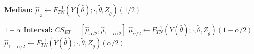 \documentclass[11pt, oneside]{article}
\begin{document}
\begin{algorithm}
\begin{algorithmic}
\vspace{0.2cm}
\STATE \textbf{Median:}
\STATE \hspace{0.3cm} $\hat{\mu}_{\frac{1}{2}} \leftarrow F_{TN}^{-1} \left(Y(\hat{\theta}) ; \cdot, \tilde{\theta}, Z_{\tilde{\theta}}\right)\left(1/2\right)$

\vspace{0.2cm}
\STATE \textbf{$1-\alpha$ Interval:} $CS_{E T}=\left[\hat{\mu}_{\alpha / 2}, \hat{\mu}_{1-\alpha / 2}\right]$
\STATE \hspace{0.3cm} $\hat{\mu}_{\alpha/2} \leftarrow F_{TN}^{-1} \left(Y(\hat{\theta}) ; \cdot, \tilde{\theta}, Z_{\tilde{\theta}}\right)\left(1-\alpha/2\right)$
\STATE \hspace{0.3cm} $\hat{\mu}_{1-\alpha/2} \leftarrow F_{TN}^{-1} \left(Y(\hat{\theta}) ; \cdot, \tilde{\theta}, Z_{\tilde{\theta}}\right)\left(\alpha/2\right)$
\end{algorithmic}
\end{algorithm}
\end{document}
